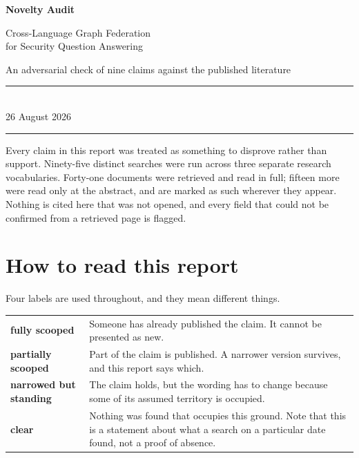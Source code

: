\documentclass[11pt,a4paper]{article}
\newcommand{\vkilled}{\textcolor{killed}{\textbf{fully scooped}}}
\newcommand{\vpartial}{\textcolor{partial}{\textbf{partially scooped}}}
\newcommand{\vstanding}{\textcolor{standing}{\textbf{narrowed but standing}}}
\newcommand{\vclear}{\textcolor{clear}{\textbf{clear}}}
\begin{document}
\begin{titlepage}
\centering
\vspace*{2.5cm}
{\Huge\bfseries Novelty Audit\par}
\vspace{0.5cm}
{\LARGE Cross-Language Graph Federation\\[2mm] for Security Question Answering\par}
\vspace{1.4cm}
{\large An adversarial check of nine claims against the published literature\par}
\vspace{2.2cm}
\begin{minipage}{0.72\textwidth}
\centering
\rule{\textwidth}{0.4pt}\\[3mm]
{\large 26 August 2026}\\[3mm]
\rule{\textwidth}{0.4pt}
\end{minipage}
\vspace{2.2cm}

\begin{minipage}{0.78\textwidth}
\RaggedRight\small
Every claim in this report was treated as something to disprove rather than
support. Ninety-five distinct searches were run across three separate research
vocabularies. Forty-one documents were retrieved and read in full; fifteen more
were read only at the abstract, and are marked as such wherever they appear.
Nothing is cited here that was not opened, and every field that could not be
confirmed from a retrieved page is flagged.
\end{minipage}
\vfill
\end{titlepage}

\tableofcontents
\newpage

\section{How to read this report}

Four labels are used throughout, and they mean different things.

\begin{center}
\begin{tabularx}{\textwidth}{@{}l>{\RaggedRight}X@{}}
\toprule
\vkilled & Someone has already published the claim. It cannot be presented as new. \\
\vpartial & Part of the claim is published. A narrower version survives, and this report says which. \\
\vstanding & The claim holds, but the wording has to change because some of its assumed territory is occupied. \\
\vclear & Nothing was found that occupies this ground. Note that this is a statement about what a search on a particular date found, not a proof of absence. \\
\bottomrule
\end{tabularx}
\end{center}
\end{document}

